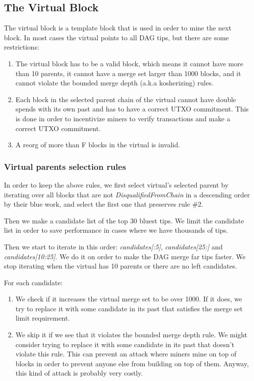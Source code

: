\subsection{The Virtual Block}
The virtual block is a template block that is used in order to mine the next block. In most cases the virtual points to
all DAG tips, but there are some restrictions:

\begin{enumerate}
  \item The virtual block has to be a valid block, which means it cannot have more than 10 parents, it cannot have a merge set larger than 1000 blocks, and it cannot violate the bounded merge depth (a.k.a kosherizing) rules.
  \item Each block in the selected parent chain of the virtual cannot have double spends with its own past and has to have a
   correct UTXO commitment. This is done in order to incentivize miners to verify transactions and make a correct UTXO
   commitment.
  \item A reorg of more than F blocks in the virtual is invalid.
\end{enumerate}

\subsubsection{Virtual parents selection rules}

In order to keep the above rules, we first select virtual's selected parent by iterating over all blocks that are not
\textit{DisqualifiedFromChain} in a descending order by their blue work, and select the first one that preserves rule \#2.

Then we make a candidate list of the top 30 bluest tips. We limit the candidate list in order to save performance in cases where we have thousands of tips.

Then we start to iterate in this order: \textit{candidates[:5]}, \textit{candidates[25:]} and \textit{candidates[10:25]}. We do it on order to
make the DAG merge far tips faster. We stop iterating when the virtual has 10 parents or there are no left candidates.

For each candidate:

\begin{enumerate}
    \item We check if it increases the virtual merge set to be over 1000. If it does, we try to replace it with some candidate
   in its past that satisfies the merge set limit requirement.

    \item We skip it if we see that it violates the bounded merge depth rule. We might consider trying to replace it with some
   candidate in its past that doesn't violate this rule. This can prevent an attack where miners mine on top of blocks
   in order to prevent anyone else from building on top of them. Anyway, this kind of attack is probably very costly.
\end{enumerate}